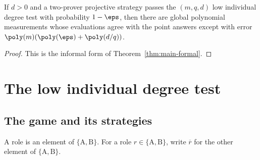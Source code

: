\begin{theorem}\label{thm:main-informal}
	If $d > 0$ and a two-prover projective strategy passes the $(m,q,d)$ low individual degree test with probability $1-\eps$, then there are global polynomial measurements whose evaluations agree with the point answers except with error $\poly(m)(\poly(\eps)+\poly(d/q))$.
\end{theorem}
\begin{proof}
	This is the informal form of Theorem~\ref{thm:main-formal}.
\end{proof}


\chapter{The low individual degree test}
\label{chap:test}
\label{sec:the-test}

\section{The game and its strategies}

\begin{definition}[Roles]\label{def:roles}
	\leanok
	A role is an element of $\{\mathrm A,\mathrm B\}$. For a role $r \in \{\mathrm A,\mathrm B\}$, write $\overline r$ for the other element of $\{\mathrm A,\mathrm B\}$.
\end{definition}

